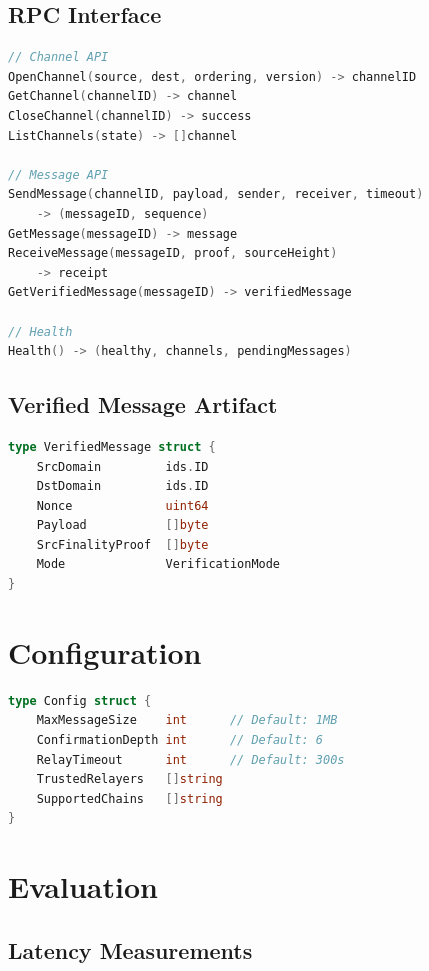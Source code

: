 \documentclass[11pt,twocolumn]{article}
\begin{document}
\subsection{RPC Interface}

\begin{lstlisting}[language=Go,basicstyle=\ttfamily\small]
// Channel API
OpenChannel(source, dest, ordering, version) -> channelID
GetChannel(channelID) -> channel
CloseChannel(channelID) -> success
ListChannels(state) -> []channel

// Message API
SendMessage(channelID, payload, sender, receiver, timeout)
    -> (messageID, sequence)
GetMessage(messageID) -> message
ReceiveMessage(messageID, proof, sourceHeight)
    -> receipt
GetVerifiedMessage(messageID) -> verifiedMessage

// Health
Health() -> (healthy, channels, pendingMessages)
\end{lstlisting}

\subsection{Verified Message Artifact}

\begin{lstlisting}[language=Go,basicstyle=\ttfamily\small]
type VerifiedMessage struct {
    SrcDomain         ids.ID
    DstDomain         ids.ID
    Nonce             uint64
    Payload           []byte
    SrcFinalityProof  []byte
    Mode              VerificationMode
}
\end{lstlisting}

\section{Configuration}

\begin{lstlisting}[language=Go,basicstyle=\ttfamily\small]
type Config struct {
    MaxMessageSize    int      // Default: 1MB
    ConfirmationDepth int      // Default: 6
    RelayTimeout      int      // Default: 300s
    TrustedRelayers   []string
    SupportedChains   []string
}
\end{lstlisting}

\section{Evaluation}

\subsection{Latency Measurements}
\end{document}
